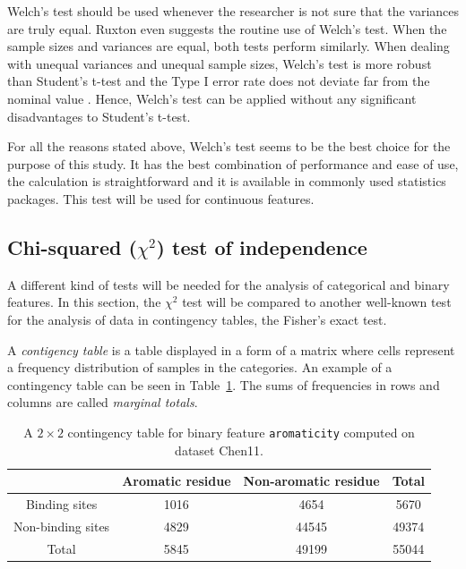 Welch's test should be used whenever the researcher is not sure that the variances are truly equal. Ruxton \cite{ruxton} even suggests the routine use of Welch's test. When the sample sizes and variances are equal, both tests perform similarly. When dealing with unequal variances and unequal sample sizes, Welch's test is more robust than Student's t-test and the Type I error rate does not deviate far from the nominal value \cite{derrick}. Hence, Welch's test can be applied without any significant disadvantages to Student's t-test.

For all the reasons stated above, Welch's test seems to be the best choice for the purpose of this study. It has the best combination of performance and ease of use, the calculation is straightforward and it is available in commonly used statistics packages. This test will be used for continuous features.

\subsection{Chi-squared ($\chi^{2}$) test of independence}

A different kind of tests will be needed for the analysis of categorical and binary features. In this section, the $\chi^{2}$ test will be compared to another well-known test for the analysis of data in contingency tables, the Fisher's exact test.

A \textit{contigency table} is a table displayed in a form of a matrix where cells represent a frequency distribution of samples in the categories. An example of a contingency table can be seen in Table~\ref{tab:contingency_table_example}. The sums of frequencies in rows and columns are called \textit{marginal totals}.

\begin{table}[!htbp]
\centering
\renewcommand{\arraystretch}{1.5}
 \begin{tabular}{|c|c|c||c|} 
 \hline
  & Aromatic residue & Non-aromatic residue & Total \\ [0.5ex] 
 \hline
 Binding sites & 1016 & 4654 & 5670 \\ 
 \hline
 Non-binding sites & 4829 & 44545 & 49374 \\
 \hline\hline
 Total & 5845 & 49199 & 55044 \\
 \hline
\end{tabular}
\caption[A $2\times 2$ contingency table for binary feature \texttt{aromaticity}]{A $2\times 2$ contingency table for binary feature \texttt{aromaticity} computed on dataset Chen11.}\label{tab:contingency_table_example}
\end{table}

